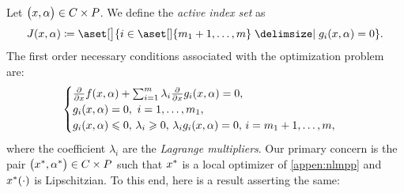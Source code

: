 \documentclass[11pt]{report}
\begin{document}
\vspace{1mm}
Let \(\bigl(x,\alpha\bigr) \in C \times P\). We define the \emph{active index set} as 
\begin{align} \label{mpp:active_index_set}
    J(\dcv,\param) \Let \aset[\big]{i \in \aset[]{m_1+1,\ldots,m} \suchthat g_i (\dcv,\param)=0}. 
\end{align}
The first order necessary conditions associated with the optimization problem are:
\begin{equation}
\label{mpp:first_order_cond} 
    \begin{aligned}
    \begin{cases}
    \frac{\partial}{\partial x} f(x,\alpha)+\sum_{i=1}^{m}\lambda_i \frac{\partial}{\partial x} g_i(x,\alpha)=0, \\ g_i(x,\alpha)=0, \,\, i=1,\ldots,m_1,  \\ g_i(x,\alpha)\leqslant 0,\, \lambda_i \geqslant 0, \, \lambda_i g_i(x,\alpha)=0,\,i=m_1+1,\ldots,m,
    \end{cases}
\end{aligned}
\end{equation}
where the coefficient \(\lambda_i\) are the \emph{Lagrange multipliers}. Our primary concern is the pair \(\bigl(x^\ast,\alpha^\ast\bigr) \in C \times P\) such that \(x^\ast\) is a local optimizer of \eqref{appen:nlmpp} and \(x^\ast(\cdot)\) is Lipschitzian. To this end, here is a result asserting the same: 
\end{document}
